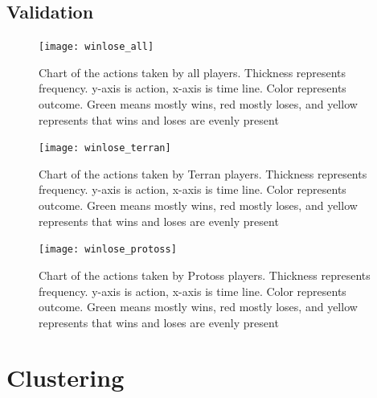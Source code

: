 \documentclass[a4paper,11pt]{article}
\begin{document}
\subsection{Validation}
  \begin{figure}[H]
    \centering
    \texttt{[image: winlose\_all]}
    \caption{Chart of the actions taken by all players. Thickness represents frequency. y-axis is action, x-axis is time line. Color represents outcome. Green means mostly wins, red mostly loses, and yellow represents that wins and loses are evenly present}
  \end{figure}
  \begin{figure}[H]
    \centering
    \texttt{[image: winlose\_terran]}
    \caption{Chart of the actions taken by Terran players. Thickness represents frequency. y-axis is action, x-axis is time line. Color represents outcome. Green means mostly wins, red mostly loses, and yellow represents that wins and loses are evenly present}
  \end{figure}
  \begin{figure}[H]
    \centering
    \texttt{[image: winlose\_protoss]}
    \caption{Chart of the actions taken by Protoss players. Thickness represents frequency. y-axis is action, x-axis is time line. Color represents outcome. Green means mostly wins, red mostly loses, and yellow represents that wins and loses are evenly present}
  \end{figure}

\section{Clustering}
\end{document}
